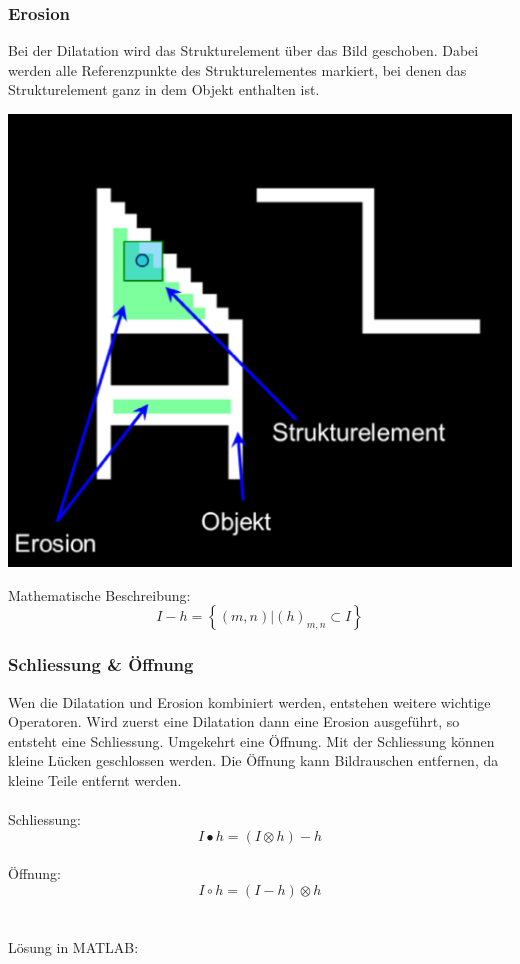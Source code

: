 \subsubsection{Erosion}
Bei der Dilatation wird das Strukturelement über das Bild geschoben.
Dabei werden alle Referenzpunkte des Strukturelementes markiert, bei denen das Strukturelement ganz in dem Objekt enthalten ist.
\begin{center}
	\includegraphics[scale=0.5]{../fig/erosion.png}
\end{center}
Mathematische Beschreibung:
\[
	I - h = \left\lbrace (m,n) | (h)_{m,n} \subset I \right\rbrace
\]

\subsubsection{Schliessung \& Öffnung}
Wen die Dilatation und Erosion kombiniert werden, entstehen weitere wichtige Operatoren.
Wird zuerst eine Dilatation dann eine Erosion ausgeführt, so entsteht eine Schliessung.
Umgekehrt eine Öffnung.
Mit der Schliessung können kleine Lücken geschlossen werden.
Die Öffnung kann Bildrauschen entfernen, da kleine Teile entfernt werden.\\
\\
Schliessung:
\[
	I \bullet h = (I \otimes h) - h
\]
~\\
Öffnung:
\[
	I \circ h = (I - h) \otimes h
\]
~\\\\
Lösung in MATLAB:
\lstset{language=Matlab}

~\\

